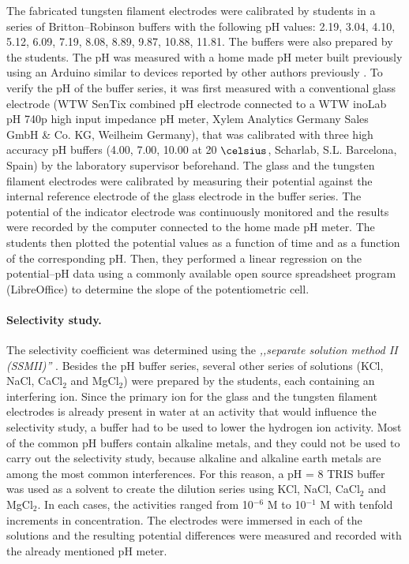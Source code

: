 \documentclass[manuscript=article, journal=jceda8]{achemso}
\begin{document}
The fabricated tungsten filament electrodes were calibrated by students in a series of Britton--Robinson buffers with the following pH values: 2.19, 3.04, 4.10, 5.12, 6.09, 7.19, 8.08, 8.89, 9.87, 10.88, 11.81. The buffers were also prepared by the students. The pH was measured with a home made pH meter built previously using an Arduino similar to devices reported by other authors previously \cite{jin2018open}. 
To verify the pH of the buffer series, it was first measured with a conventional glass electrode (WTW SenTix combined pH electrode connected to a WTW inoLab pH 740p high input impedance pH meter, Xylem Analytics Germany Sales GmbH \& Co. KG, Weilheim Germany), that was calibrated with three high accuracy pH buffers (4.00, 7.00, 10.00 at 20 $\celsius$, Scharlab, S.L. Barcelona, Spain) by the laboratory supervisor beforehand.
The glass and the tungsten filament electrodes were calibrated by measuring their potential against the internal reference electrode of the glass electrode in the buffer series. The potential of the indicator electrode was continuously monitored and the results were recorded by the computer connected to the home made pH meter.
The students then plotted the potential values as a function of time and as a function of the corresponding pH. Then, they performed a linear regression on the potential--pH data using a commonly available open source spreadsheet program (LibreOffice) to determine the slope of the potentiometric cell. 


\paragraph{Selectivity study.}

The selectivity coefficient was determined using the \emph{,,separate solution method II (SSMII)''} \cite{buck1994recommendations}. Besides the pH buffer series, several other series of solutions (KCl, NaCl, CaCl$_2$ and MgCl$_2$) were prepared by the students, each containing an interfering ion. Since the primary ion for the glass and the tungsten filament electrodes is already present in water at an activity that would influence the selectivity study, a buffer had to be used to lower the hydrogen ion activity. Most of the common pH buffers contain alkaline metals, and they could not be used to carry out the selectivity study, because alkaline and alkaline earth metals are among the most common interferences. For this reason, a pH = 8 TRIS buffer was used as a solvent to create the dilution series using KCl, NaCl, CaCl$_2$ and MgCl$_2$. In each cases, the activities ranged from 10$^{-6}$ M to 10$^{-1}$ M with tenfold increments in concentration. The electrodes were immersed in each of the solutions and the resulting potential differences were measured and recorded with the already mentioned pH meter. 
\end{document}

